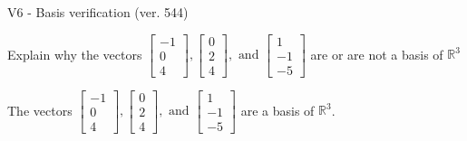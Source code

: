 \begin{exercise}
  \begin{exerciseTitle}V6 - Basis verification (ver. 544)\end{exerciseTitle}
  \begin{exerciseStatement}
    Explain why the vectors \(\left[\begin{array}{r}
-1 \\
0 \\
4
\end{array}\right] , \left[\begin{array}{r}
0 \\
2 \\
4
\end{array}\right] , \text{ and } \left[\begin{array}{r}
1 \\
-1 \\
-5
\end{array}\right]\) are or are not a basis of \(\mathbb{R}^3\)	


  \end{exerciseStatement}
  \begin{exerciseAnswer}
   The vectors \(\left[\begin{array}{r}
-1 \\
0 \\
4
\end{array}\right] , \left[\begin{array}{r}
0 \\
2 \\
4
\end{array}\right] , \text{ and } \left[\begin{array}{r}
1 \\
-1 \\
-5
\end{array}\right]\) 
  	 are  a basis of \(\mathbb{R}^3\).
  


  \end{exerciseAnswer}
\end{exercise}